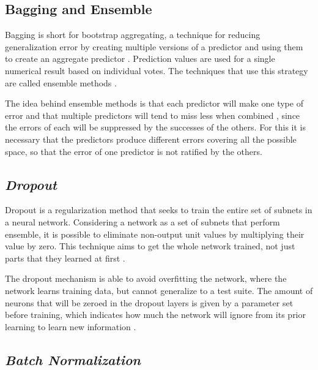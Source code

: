 \subsection{Bagging and Ensemble}
\label{cap2_bagging_ensemble}

Bagging is short for bootstrap aggregating, a technique for reducing generalization error by creating multiple versions of a predictor and using them to create an aggregate predictor \cite{Breiman1996}. 
Prediction values are used for a single numerical result based on individual votes.
The techniques that use this strategy are called ensemble methods \cite{Breiman1996} \cite[Ch. 7]{Goodfellow2016}.

The idea behind ensemble methods is that each predictor will make one type of error and that multiple predictors will tend to miss less when combined \cite{Goodfellow2016}, since the errors of each will be suppressed by the successes of the others.
For this it is necessary that the predictors produce different errors covering all the possible space, so that the error of one predictor is not ratified by the others.

\subsection{\textit{Dropout}}
\label{cap2_dropout}

Dropout is a regularization method that seeks to train the entire set of subnets in a neural network.
Considering a network as a set of subnets that perform ensemble, it is possible to eliminate non-output unit values by multiplying their value by zero.
This technique aims to get the whole network trained, not just parts that they learned at first \cite[Ch. 7]{Goodfellow2016}.

The dropout mechanism is able to avoid overfitting the network, where the network learns training data, but cannot generalize to a test suite. 
The amount of neurons that will be zeroed in the dropout layers is given by a parameter set before training, which indicates how much the network will ignore from its prior learning to learn new information \cite{Srivastava2014Dropout}.

\subsection{\textit{Batch Normalization}}
\label{cap2_batch_normalization}

